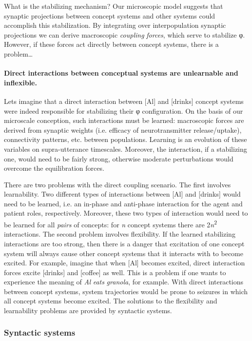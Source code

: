  What is the stabilizing mechanism? Our microscopic model suggests that synaptic projections between concept systems and other systems could accomplish this stabilization. By integrating over interpopulation synaptic projections we can derive macroscopic \textit{coupling} \textit{forces}, which serve to stabilize φ. However, if these forces act directly between concept systems, there is a problem…

\paragraph{Direct interactions between conceptual systems are unlearnable and inflexible.} 

Lets imagine that a direct interaction between [Al] and [drinks] concept systems were indeed responsible for stabilizing their φ configuration. On the basis of our microscale conception, such interactions must be learned: macroscopic forces are derived from synaptic weights (i.e. efficacy of neurotransmitter release/uptake), connectivity patterns, etc. between populations. Learning is an evolution of these variables on supra-utterance timescales. Moreover, the interaction, if a stabilizing one, would need to be fairly strong, otherwise moderate perturbations would overcome the equilibration forces. 

  There are two problems with the direct coupling scenario. The first involves learnability. Two different types of interactions between [Al] and [drinks] would need to be learned, i.e. an in-phase and anti-phase interaction for the agent and patient roles, respectively. Moreover, these two types of interaction would need to be learned for all \textit{pairs} of concepts: for \textit{n} concept systems there are 2\textit{n}\textsuperscript{2} interactions. The second problem involves flexibility. If the learned stabilizing interactions are too strong, then there is a danger that excitation of one concept system will always cause other concept systems that it interacts with to become excited. For example, imagine that when [Al] becomes excited, direct interaction forces excite [drinks] and [coffee] as well. This is a problem if one wants to experience the meaning of \textit{Al} \textit{eats} \textit{granola}, for example. With direct interactions between concept systems, system trajectories would be prone to seizures in which all concept systems become excited. The solutions to the flexibility and learnability problems are provided by syntactic systems.

\subsubsection{Syntactic systems}

